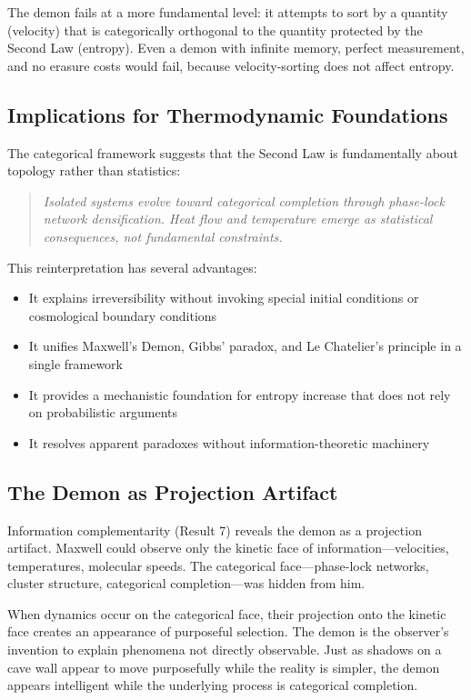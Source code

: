 \documentclass[twocolumn,showpacs,preprintnumbers,amsmath,amssymb,prd]{revtex4-2}
\theoremstyle{definition}
\theoremstyle{remark}
\begin{document}
The demon fails at a more fundamental level: it attempts to sort by a quantity (velocity) that is categorically orthogonal to the quantity protected by the Second Law (entropy). Even a demon with infinite memory, perfect measurement, and no erasure costs would fail, because velocity-sorting does not affect entropy.

\subsection{Implications for Thermodynamic Foundations}

The categorical framework suggests that the Second Law is fundamentally about topology rather than statistics:

\begin{quote}
\textit{Isolated systems evolve toward categorical completion through phase-lock network densification. Heat flow and temperature emerge as statistical consequences, not fundamental constraints.}
\end{quote}

This reinterpretation has several advantages:
\begin{itemize}
\item It explains irreversibility without invoking special initial conditions or cosmological boundary conditions
\item It unifies Maxwell's Demon, Gibbs' paradox, and Le Chatelier's principle in a single framework
\item It provides a mechanistic foundation for entropy increase that does not rely on probabilistic arguments
\item It resolves apparent paradoxes without information-theoretic machinery
\end{itemize}

\subsection{The Demon as Projection Artifact}

Information complementarity (Result 7) reveals the demon as a projection artifact. Maxwell could observe only the kinetic face of information---velocities, temperatures, molecular speeds. The categorical face---phase-lock networks, cluster structure, categorical completion---was hidden from him.

When dynamics occur on the categorical face, their projection onto the kinetic face creates an appearance of purposeful selection. The demon is the observer's invention to explain phenomena not directly observable. Just as shadows on a cave wall appear to move purposefully while the reality is simpler, the demon appears intelligent while the underlying process is categorical completion.
\end{document}
